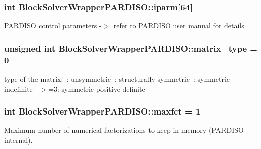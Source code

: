 \subsubsection[{\texorpdfstring{iparm}{iparm}}]{\setlength{\rightskip}{0pt plus 5cm}int Block\+Solver\+Wrapper\+P\+A\+R\+D\+I\+S\+O\+::iparm\mbox{[}64\mbox{]}\hspace{0.3cm}{\ttfamily [private]}}\hypertarget{class_block_solver_wrapper_p_a_r_d_i_s_o_a61c49eda443075c200c9583f982ca447}{}\label{class_block_solver_wrapper_p_a_r_d_i_s_o_a61c49eda443075c200c9583f982ca447}
P\+A\+R\+D\+I\+SO control parameters -\/$>$ refer to P\+A\+R\+D\+I\+SO user manual for details 
\subsubsection[{\texorpdfstring{matrix\+\_\+type}{matrix_type}}]{\setlength{\rightskip}{0pt plus 5cm}unsigned int Block\+Solver\+Wrapper\+P\+A\+R\+D\+I\+S\+O\+::matrix\+\_\+type = 0}\hypertarget{class_block_solver_wrapper_p_a_r_d_i_s_o_adc6d3f7f878c578aff518cb907e157ff}{}\label{class_block_solver_wrapper_p_a_r_d_i_s_o_adc6d3f7f878c578aff518cb907e157ff}
type of the matrix\+:~\+: unsymmetric~\+: structurally symmetric~\+: symmetric indefinite~\newline
 $>$=3\+: symmetric positive definite 
\subsubsection[{\texorpdfstring{maxfct}{maxfct}}]{\setlength{\rightskip}{0pt plus 5cm}int Block\+Solver\+Wrapper\+P\+A\+R\+D\+I\+S\+O\+::maxfct = 1\hspace{0.3cm}{\ttfamily [private]}}\hypertarget{class_block_solver_wrapper_p_a_r_d_i_s_o_a3d6d894f09dcdeae1295cf5072b79451}{}\label{class_block_solver_wrapper_p_a_r_d_i_s_o_a3d6d894f09dcdeae1295cf5072b79451}
Maximum number of numerical factorizations to keep in memory (P\+A\+R\+D\+I\+SO internal). 

